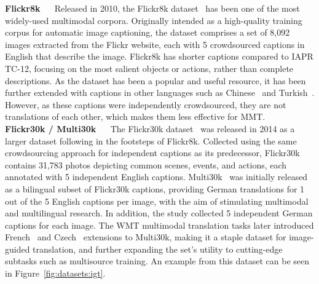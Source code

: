 \documentclass{svjour3}
\newcommand{\element}[1]{\noindent\textbf{#1} ~~}
\begin{document}
        \element{Flickr8k}
            Released in 2010, the Flickr8k dataset~\citep{rashtchian-collecting-2010} has been one of the most widely-used multimodal corpora. Originally intended as a high-quality training corpus for automatic image captioning, the dataset comprises a set of 8,092 images extracted from the Flickr website, each with 5 crowdsourced captions in English that describe the image. Flickr8k has shorter captions compared to IAPR TC-12, focusing on the most salient objects or actions, rather than complete descriptions. As the dataset has been a popular and useful resource, it has been further extended with captions in other languages such as Chinese~\citep{li-adding-2016} and Turkish~\citep{unal-tasviret:-2016}. However, as these captions were independently crowdsourced, they are not translations of each other, which makes them less effective for MMT. \\
        




        \element{Flickr30k / Multi30k}
            The Flickr30k dataset~\citep{young-image-2014} was released in 2014 as a larger dataset following in the footsteps of Flickr8k. Collected using the same crowdsourcing approach for independent captions as its predecessor, Flickr30k contains 31,783 photos depicting common scenes, events, and actions, each annotated with 5 independent English captions. Multi30k~\citep{elliott-multi30k:-2016} was initially released as a bilingual subset of Flickr30k captions, providing German translations for 1 out of the 5 English captions per image, with the aim of stimulating multimodal and multilingual research. In addition, the study collected 5 independent German captions for each image. The WMT multimodal translation tasks later introduced French~\citep{elliott-findings-2017} and Czech~\citep{barrault-findings-2018} extensions to Multi30k, making it a staple dataset for image-guided translation, and further expanding the set's utility to cutting-edge subtasks such as multisource training. An example from this dataset can be seen in Figure~\ref{fig:datasets:igt}. \\
        
\end{document}
